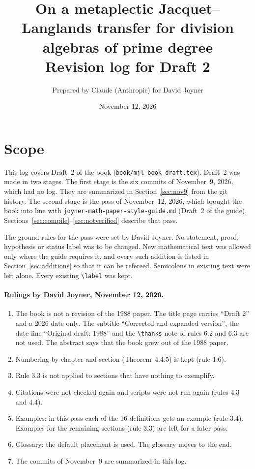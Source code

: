\documentclass[12pt,letterpaper]{article}
\title{On a metaplectic Jacquet--Langlands transfer for division algebras of prime degree\\[0.5em]
\large Revision log for Draft 2}
\author{Prepared by Claude (Anthropic) for David Joyner}
\date{November 12, 2026}
\begin{document}
\maketitle
\tableofcontents

\section{Scope}
This log covers Draft~2 of the book (\texttt{book/mjl\_book\_draft.tex}). Draft~2 was made in two stages. The first stage is the six commits of November~9, 2026, which had no log. They are summarized in Section~\ref{sec:nov9} from the git history. The second stage is the pass of November~12, 2026, which brought the book into line with \texttt{joyner-math-paper-style-guide.md} (Draft~2 of the guide). Sections~\ref{sec:compile}--\ref{sec:notverified} describe that pass.

The ground rules for the pass were set by David Joyner. No statement, proof, hypothesis or status label was to be changed. New mathematical text was allowed only where the guide requires it, and every such addition is listed in Section~\ref{sec:additions} so that it can be refereed. Semicolons in existing text were left alone. Every existing \verb|\label| was kept.

\paragraph{Rulings by David Joyner, November 12, 2026.}
\begin{enumerate}[leftmargin=*]
\item The book is not a revision of the 1988 paper. The title page carries ``Draft 2'' and a 2026 date only. The subtitle ``Corrected and expanded version'', the date line ``Original draft: 1988'' and the \verb|\thanks| note of rules 6.2 and 6.3 are not used. The abstract says that the book grew out of the 1988 paper.
\item Numbering by chapter and section (Theorem~4.4.5) is kept (rule 1.6).
\item Rule 3.3 is not applied to sections that have nothing to exemplify.
\item Citations were not checked again and scripts were not run again (rules 4.3 and 4.4).
\item Examples: in this pass each of the 16 definitions gets an example (rule 3.4). Examples for the remaining sections (rule 3.3) are left for a later pass.
\item Glossary: the default placement is used. The glossary moves to the end.
\item The commits of November~9 are summarized in this log.
\end{enumerate}
\end{document}
